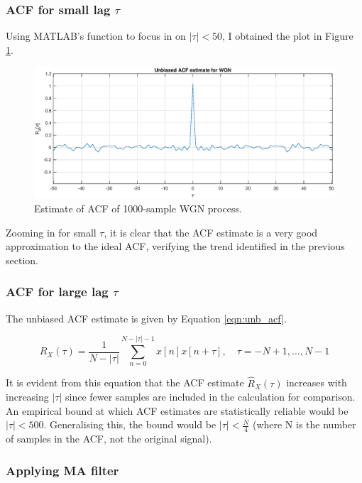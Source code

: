 \subsubsection{ACF for small lag $\tau$}

Using MATLAB's  function to focus in on $|\tau|<50$, I obtained the plot in Figure \ref{fig:acf_zoom}.

\begin{figure}[H]
    \centering
    \includegraphics[width=14cm]{assignment2figs/acfzoom.eps}
    \caption{Estimate of ACF of 1000-sample WGN process.}
    \label{fig:acf_zoom}
\end{figure}

\noindent
Zooming in for small $\tau$, it is clear that the ACF estimate is a very good approximation to the ideal ACF, verifying the trend identified in the previous section.

\subsubsection{ACF for large lag $\tau$}

The unbiased ACF estimate is given by Equation \ref{eqn:unb_acf}.

\begin{equation}
\widehat{R}_{X}(\tau)=\frac{1}{N-|\tau|} \sum_{n=0}^{N-|\tau|-1} x[n] x[n+\tau], \quad \tau=-N+1, \ldots, N-1
\label{eqn:unb_acf}
\end{equation}

\noindent
It is evident from this equation that the ACF estimate $\widehat{R}_{X}(\tau)$ increases with increasing $|\tau|$ since fewer samples are included in the calculation for comparison. An empirical bound at which ACF estimates are statistically reliable would be $|\tau| < 500$. Generalising this, the bound would be  $|\tau| < \frac{N}{4}$ (where N is the number of samples in the ACF, not the original signal).

\subsubsection{Applying MA filter}

